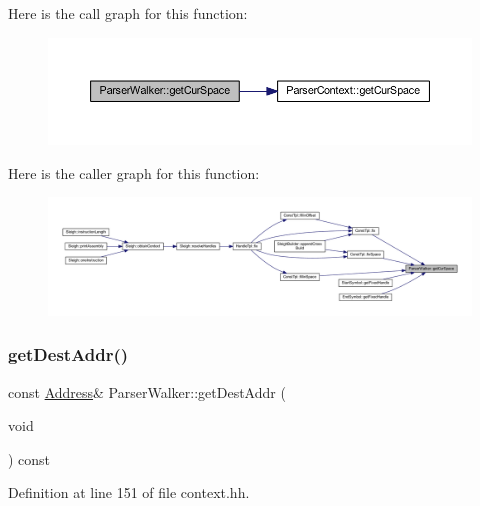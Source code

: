 Here is the call graph for this function\+:
\nopagebreak
\begin{figure}[H]
\begin{center}
\leavevmode
\includegraphics[width=350pt]{class_parser_walker_a6af3a4ebd3a69f52ebcae2dd197ffd11_cgraph}
\end{center}
\end{figure}
Here is the caller graph for this function\+:
\nopagebreak
\begin{figure}[H]
\begin{center}
\leavevmode
\includegraphics[width=350pt]{class_parser_walker_a6af3a4ebd3a69f52ebcae2dd197ffd11_icgraph}
\end{center}
\end{figure}
\mbox{\label{class_parser_walker_a8593ab995c8656e789b3b6aa933a4147}} 
\subsubsection{\texorpdfstring{getDestAddr()}{getDestAddr()}}
{\footnotesize\ttfamily const \mbox{\hyperlink{class_address}{Address}}\& Parser\+Walker\+::get\+Dest\+Addr (\begin{DoxyParamCaption}\item[{void}]{ }\end{DoxyParamCaption}) const\hspace{0.3cm}{\ttfamily [inline]}}



Definition at line 151 of file context.\+hh.

